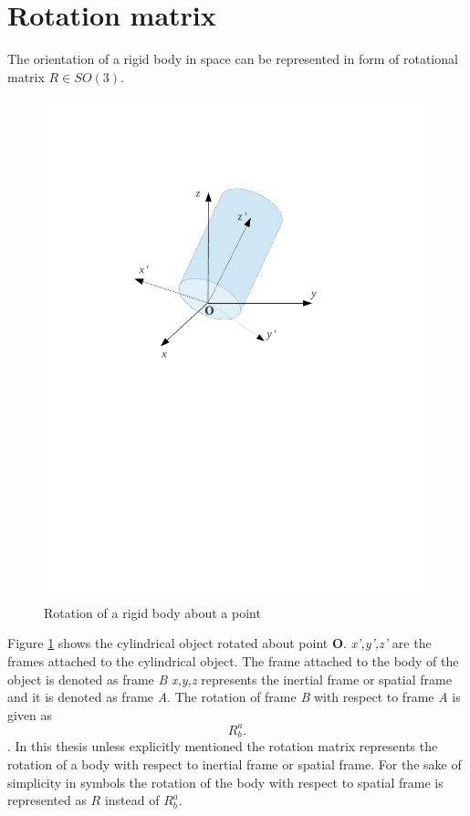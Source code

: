 \section{Rotation matrix}
\label{sec:rot_mat}
The orientation of a rigid body in space can be represented in form of rotational matrix $R \in SO(3)$. 
\begin{figure}
    \centering
    \includegraphics[trim = 5cm 13cm 5cm 5cm, scale = 0.65]{Bilder/rot_ab.pdf}
    \caption{Rotation of a rigid body about a point}
    \label{fig:rot_ab}
\end{figure}
Figure \ref{fig:rot_ab} shows the cylindrical object rotated about point \textbf{O}. \emph{x',y',z'} are the frames attached to the cylindrical object. The frame attached to the body of the object is denoted as frame \emph{B} \emph{x,y,z} represents the inertial frame or spatial frame and it is denoted as frame \emph{A}. The rotation of frame \emph{B} with respect to frame \emph{A} is given as $$ R_b^a.$$. In this thesis unless explicitly mentioned the rotation matrix represents the rotation of a body with respect to inertial frame or spatial frame. For the sake of simplicity in symbols the rotation of the body with respect to spatial frame is represented as $R$ instead of $R_b^a$.

